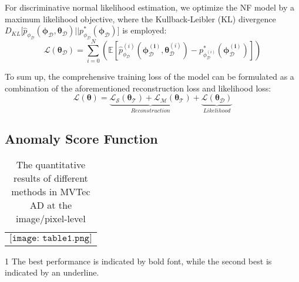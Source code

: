 \documentclass[journal]{IEEEtran}
\begin{document}
For discriminative normal likelihood estimation, we optimize the NF model by a maximum likelihood objective, where the Kullback-Leibler (KL) divergence  $D_{KL}\big [ \hat{p}_{\phi_{\mathcal{D} }} \left ( \boldsymbol{\phi_{\mathcal{D} }}, \boldsymbol{\theta _{\mathcal{D}}}\right ) \left |  \right |  p^{*}_{\phi_{\mathcal{D} }} \left ( \boldsymbol{\phi_{\mathcal{D} }}\right )  \big ]$ is employed:
\begin{equation}
\mathcal{L}\left (  \boldsymbol{\theta }_{\mathcal{D} } \right ) =\sum_{i=0}^{N} \left ( \mathbb{E} \left [ { \hat{p}_{\phi_{\mathcal{D} }}^{(i)} \left ( \boldsymbol{\phi_{\mathcal{D}}^{(i)}}, \boldsymbol{\theta}_{\mathcal{D}}^{(i)} \right )}-  p^{*}_{\phi_{\mathcal{D} }^{(i)}} \left ( \boldsymbol{\phi_{\mathcal{D} }^{(i)}}\right ) \right ]  \right ) 
\end{equation}

To sum up, the comprehensive training loss of the model can be formulated as a combination of the aforementioned reconstruction loss and likelihood loss:
\begin{equation}
\mathcal{L}\left ( \boldsymbol{\theta } \right ) =\underbrace{\mathcal{L}_{\mathcal{S}}\left (  \boldsymbol{\theta }_{\mathcal{T} } \right ) +\mathcal{L}_{\mathcal{M}}\left (  \boldsymbol{\theta }_{\mathcal{T} } \right )}_{Reconstruction} +\underbrace{\mathcal{L}\left (  \boldsymbol{\theta }_{\mathcal{D} } \right )}_{Likelihood} 
\end{equation}
\subsection{Anomaly Score Function}

\begin{table*}
\caption{{The quantitative results of different methods in MVTec AD at the image/pixel-level}}
\label{table}
\setlength{\tabcolsep}{3pt}
\begin{threeparttable}
\begin{tabular}{p{\textwidth}}
$\texttt{[image: table1.png]}$
\end{tabular}
\begin{tablenotes}
       \footnotesize
       \item[1]The best performance is indicated by bold font, while the second best is indicated by an underline.
\end{tablenotes}
\end{threeparttable}
\label{table1}
\end{table*}
\end{document}

